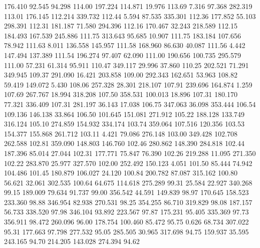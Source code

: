 176.410   92.545   94.298       114.00
 197.224  114.871   19.976       113.69
   7.316   97.368  282.319       113.01
 176.145  112.214  339.732       112.44
   5.594   87.535  335.301       112.36
 177.852   55.103  298.391       112.31
 181.187   71.580  294.396       112.16
 170.467   32.243  218.589       112.15
 184.493  167.539  245.886       111.75
 313.643   95.685   10.907       111.75
 183.184  107.656   78.942       111.63
   8.011  136.558  145.957       111.58
 168.960   86.630   40.087       111.56
   4.442  147.494  137.389       111.54
 196.274   97.407   62.090       111.00
 190.656  100.735  295.579       111.00
  57.231   61.314   95.911       110.47
 349.117   29.996   37.860       110.25
 202.521   71.291  349.945       109.37
 291.090   16.421  203.858       109.00
 292.343  162.651   53.963       108.82
  59.419  149.072    5.430       108.06
 257.328   28.301  218.107       107.91
 239.696  164.874    1.259       107.69
 267.767   18.994  318.208       107.50
 358.531  100.013   18.896       107.31
 180.170   77.321  336.409       107.31
 281.197   36.143   17.038       106.75
 347.063   36.098  353.444       106.54
 109.136  146.138   33.864       106.50
 101.645  151.081  271.912       105.22
 188.128  133.749  316.124       105.10
 274.859  154.932  334.174       103.74
 359.064  107.516  120.356       103.53
 154.377  155.868  261.712       103.11
   4.421   79.086  276.148       103.00
 349.428  102.708  262.588       102.81
 359.090  148.803  146.760       102.46
 280.862  148.390  284.818       102.44
 187.396   85.014   27.044       102.31
 177.771   75.847   76.390       102.26
 219.288   11.095  271.350       102.22
 283.870   25.977  327.570       102.00
 252.492  150.123    4.051       101.50
  85.444   74.942  104.486       101.45
 180.879  106.027   24.120       100.84
 200.782   87.087  315.162       100.80
  56.621   32.061  302.535       100.64
  64.675  114.618  275.289        99.31
  25.584   22.927  340.268        99.15
 189.009   79.634   91.737        99.00
 356.542   44.591  149.839        98.97
 170.645  158.523  233.360        98.88
 346.954   82.938  270.531        98.25
 354.255   86.710  319.829        98.08
 187.157   56.733  338.520        97.98
 346.104   93.892  223.567        97.87
 175.231   95.405  335.369        97.73
 356.911   98.472  260.096        96.00
 178.754  100.460   85.472        95.75
   0.626   68.734  307.022        95.31
 177.663   97.798  277.532        95.05
 285.505   30.965  317.698        94.75
 159.937   35.595  243.165        94.70
 214.205  143.028  274.394        94.62
